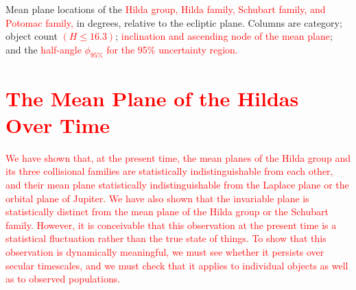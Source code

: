 \documentclass[a4paper,fleqn]{cas-sc}
\begin{document}
\begin{linenumbers}
\begin{table}
    \caption{Mean plane locations of the \textcolor{red}{Hilda group, Hilda family, Schubart family, and Potomac family,} in degrees, relative to the ecliptic plane.
    Columns are category; object count \textcolor{red}{$(H\leq16.3)$}; \textcolor{red}{inclination and ascending node of the mean plane}; and the \textcolor{red}{half-angle $\phi_{95\%}$ for the 95\% uncertainty region.
    }}
    \label{t:meanpoles_circlefit}
\end{table}



\section{\textcolor{red}{The Mean Plane of the Hildas Over Time}}
\label{s:hildas-xcc-integration}
\textcolor{red}{
We have shown that, at the present time, the mean planes of the Hilda group and its three collisional families are statistically indistinguishable from each other, and their mean plane statistically indistinguishable from the Laplace plane or the orbital plane of Jupiter.
We have also shown that the invariable plane is statistically distinct from the mean plane of the Hilda group or the Schubart family.
However, it is conceivable that this observation at the present time is a statistical fluctuation rather than the true state of things.
To show that this observation is dynamically meaningful, we must see whether it persists over secular timescales, and we must check that it applies to individual objects as well as to observed populations.
}


\end{linenumbers}
\end{document}
